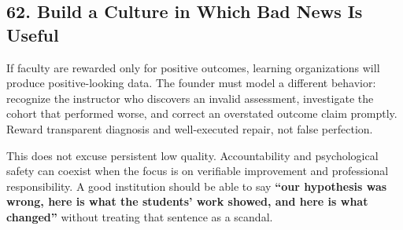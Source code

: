 \subsection*{62. Build a Culture in Which Bad News Is Useful}

If faculty are rewarded only for positive outcomes, learning organizations will produce positive-looking data. The founder must model a different behavior: recognize the instructor who discovers an invalid assessment, investigate the cohort that performed worse, and correct an overstated outcome claim promptly. Reward transparent diagnosis and well-executed repair, not false perfection.

This does not excuse persistent low quality. Accountability and psychological safety can coexist when the focus is on verifiable improvement and professional responsibility. A good institution should be able to say \textbf{``our hypothesis was wrong, here is what the students' work showed, and here is what changed''} without treating that sentence as a scandal.
